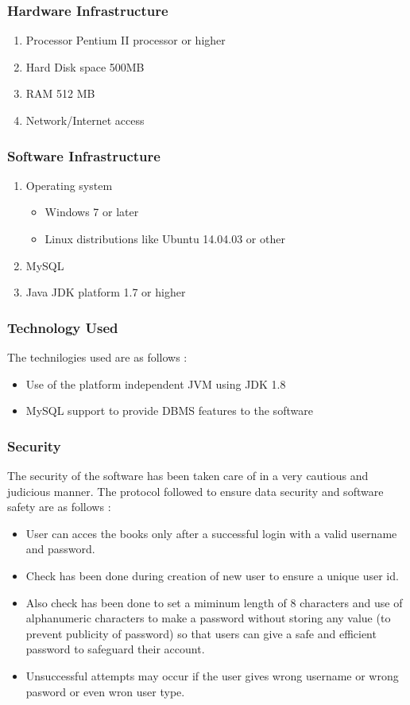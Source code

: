 \documentclass{article}
\begin{document}
\subsubsection{Hardware Infrastructure}
\begin {enumerate}
	\item Processor Pentium II processor or higher
	\item Hard Disk space 500MB
	\item RAM 512 MB
	\item Network/Internet access
\end{enumerate}
\subsubsection{Software Infrastructure}
\begin{enumerate}
	\item Operating system
		\begin{itemize}
		\item  Windows 7 or later
		\item Linux distributions like Ubuntu 14.04.03 or other
		\end{itemize}
	\item MySQL
	\item Java JDK platform 1.7 or higher
	\end{enumerate}
\subsubsection{Technology Used}
The technilogies used are as follows :
\begin{itemize}
\item Use of the platform independent JVM using JDK 1.8
\item MySQL support to provide DBMS features to the software
\end{itemize}
\subsubsection{Security}
The security of the software has been taken care of in a very cautious and judicious manner. The protocol followed to ensure data security and software safety are as follows :
\begin{itemize}
\item User can acces the books only after a successful login with a valid username and password.
\item Check has been done during creation of new user to ensure a unique user id.
\item Also check has been done to set a miminum length of 8 characters and use of alphanumeric characters to make a password without storing any value (to prevent publicity of password) so that users can give a safe and efficient password to safeguard their account. 
\item Unsuccessful attempts may occur if the user gives wrong username or wrong pasword or even wron user type.
\end{itemize}
\end{document}
